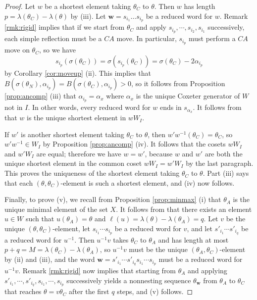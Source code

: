 \documentclass[11pt]{amsart}
\theoremstyle{plain}
\theoremstyle{definition}
\theoremstyle{remark}
\numberwithin{equation}{subsection}
\newcommand{\al}{\alpha}
\newcommand{\bfw}{\mathbf{w}}
\newcommand{\inverse}{^{-1}}
\begin{document}
\begin{proof}
Let $w$ be a shortest element taking $\theta_C$ to $\theta$. Then $w$ has length
$p=\lambda(\theta_C)-\lambda(\theta)$ by (iii). Let $\bfw=s_{i_1}\dots s_{i_p}$
be a reduced word for $w$. Remark \ref{rmk:rigid} implies that if we start from
$\theta_C$ and apply $s_{i_p}, \cdots, s_{i_2}, s_{i_1}$ successively, each
simple reflection must be a $CA$ move.  In particular, $s_{i_p}$ must perform a
$CA$ move on $\theta_C$, so we have
\[s_{i_p}(\sigma(\theta_C))=\sigma(s_{i_p}(\theta_C))=\sigma(\theta_C)-2\al_{i_p}\]
by Corollary \ref{cor:moveup} (ii). This implies that
$B(\sigma(\theta_N),\al_{i_p})=B(\sigma(\theta_C), \al_{i_p})>0$, so it follows
from Proposition \ref{prop:ancomp} (iii) that $\al_{i_p}=\al_x$ where $\al_x$ is
the unique Coxeter generator of $W$ not in $I$. In other words, every reduced
word for $w$ ends in $s_{\al_x}$.  It follows from \cite[Proposition 1.10
(c)]{humphreys90} that $w$ is the unique shortest element in $wW_I$.

If $w'$ is another shortest element taking $\theta_C$ to $\theta$, then
$w'w\inverse(\theta_C)=\theta_C$, so $w'w\inverse\in W_I$ by Proposition
\ref{prop:ancomp} (iv). It follows that the cosets $wW_I$ and $w'W_I$ are equal; therefore we have $w=w'$, because $w$ and $w'$ are both the unique shortest
element in the common coset $wW_I=w'W_I$ by the last paragraph. This proves the
uniqueness of the shortest element taking $\theta_C$ to $\theta$. Part (iii)
says that each $(\theta,\theta_C)$-element is such a shortest element, and (iv)
now follows.

Finally, to prove (v), we recall from Proposition \ref{prop:minmax} (i) that
$\theta_A$ is the unique minimal element of the set $X$. It follows from
\cite[Theorem 2.8]{rains13} that there exists an element $u\in W$ such that
$u(\theta_A)=\theta$ and $\ell(u)=\lambda(\theta)-\lambda(\theta_A)=q$. Let $v$
be the unique $(\theta,\theta_C)$-element, let $s_{i_1}\cdots s_{i_p}$ be a
reduced word for $v$, and let $s'_{i_1}\cdots s'_{i_q}$ be a reduced word for
$u\inverse$. Then $u\inverse v$ takes $\theta_C$ to $\theta_A$ and has length at
most $p+q=M=\lambda(\theta_C)-\lambda(\theta_A)$, so $u\inverse v$ must be the
unique $(\theta_A,\theta_C)$-element by (ii) and (iii), and the word
$\bfw=s'_{i_1}\cdots s'_{i_q}s_{i_1}\cdots s_{i_p}$ must be a reduced word for
$u\inverse v$. Remark \ref{rmk:rigid} now implies that starting from $\theta_A$
and applying $s'_{i_1}, \cdots, s'_{i_q}, s_{i_1},\cdots, s_{i_p}$ successively
yields a nonnesting sequence $\theta_\bfw$ from $\theta_A$ to $\theta_C$ that
reaches $\theta=v\theta_C$ after the first $q$ steps, and (v) follows.
\end{proof}
\end{document}
